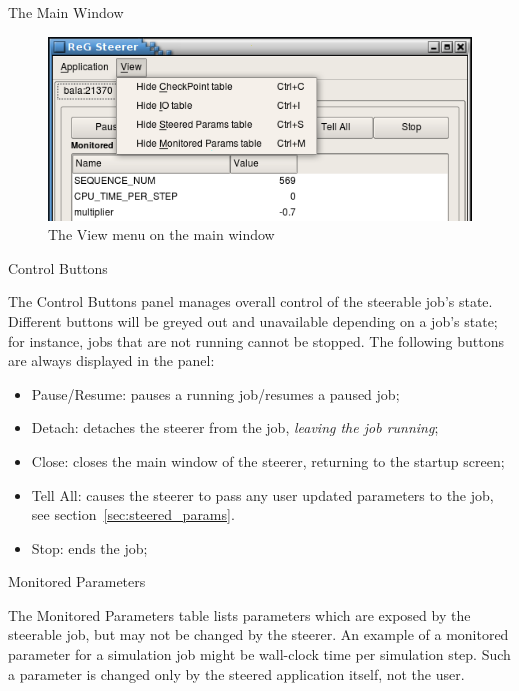 \documentclass[a4paper,twoside]{article}
\begin{document}
\begin{section}{The Main Window}
\begin{figure}
\centerline{\includegraphics{main_view_menu.png}}
\caption{The View menu on the main window}
\label{fig:view_menu}
\end{figure}


\begin{subsection}{Control Buttons}
\label{sec:control_btns}

The Control Buttons panel manages overall control of the steerable
job's state. Different buttons will be greyed out and unavailable
depending on a job's state; for instance, jobs that are not running
cannot be stopped.  The following buttons are always displayed in the
panel:
\begin{itemize}
\item Pause/Resume: pauses a running job/resumes a paused job;
\item Detach: detaches the steerer from the job, \textit{leaving the
job running};
\item Close: closes the main window of the steerer, returning to the
startup screen;
\item Tell All: causes the steerer to pass any user updated
parameters to the job, see section~\ref{sec:steered_params}.
\item Stop: ends the job;
\end{itemize}

\end{subsection} %


\begin{subsection}{Monitored Parameters}
\label{sec:mon_params}

The Monitored Parameters table lists parameters which are exposed by
the steerable job, but may not be changed by the steerer. An example
of a monitored parameter for a simulation job might be wall-clock time
per simulation step. Such a parameter is changed only by the steered
application itself, not the user.


\end{subsection}
\end{section}
\end{document}
